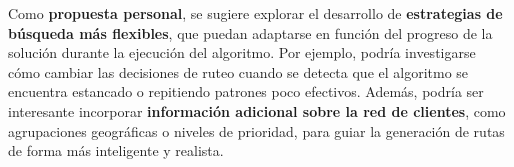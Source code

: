 \documentclass[letter, 10pt]{article}
\begin{document}
Como \textbf{propuesta personal}, se sugiere explorar el desarrollo de \textbf{estrategias de b\'usqueda m\'as flexibles}, que puedan adaptarse en funci\'on del progreso de la soluci\'on durante la ejecuci\'on del algoritmo. Por ejemplo, podr\'ia investigarse c\'omo cambiar las decisiones de ruteo cuando se detecta que el algoritmo se encuentra estancado o repitiendo patrones poco efectivos. Adem\'as, podr\'ia ser interesante incorporar \textbf{informaci\'on adicional sobre la red de clientes}, como agrupaciones geogr\'aficas o niveles de prioridad, para guiar la generaci\'on de rutas de forma m\'as inteligente y realista.

\newpage


\end{document}
